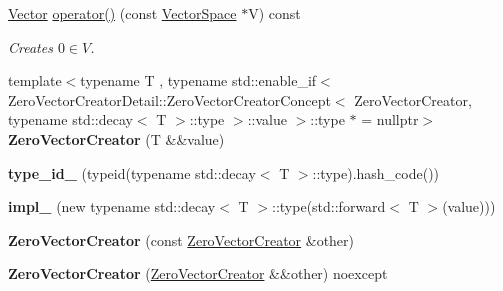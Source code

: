 \begin{DoxyCompactItemize}
\item 
\hypertarget{classSpacy_1_1ZeroVectorCreator_afb20329c56ee527505ef7390eba96870}{\hyperlink{classSpacy_1_1Vector}{\-Vector} \hyperlink{classSpacy_1_1ZeroVectorCreator_afb20329c56ee527505ef7390eba96870}{operator()} (const \hyperlink{classSpacy_1_1VectorSpace}{\-Vector\-Space} $\ast$\-V) const }\label{classSpacy_1_1ZeroVectorCreator_afb20329c56ee527505ef7390eba96870}

\begin{DoxyCompactList}\small\item\em \-Creates $ 0 \in V $. \end{DoxyCompactList}\item 
\hypertarget{classSpacy_1_1ZeroVectorCreator_aa33a8160098d48aa6034497665eaa084}{{\footnotesize template$<$typename T , typename std\-::enable\-\_\-if$<$ Zero\-Vector\-Creator\-Detail\-::\-Zero\-Vector\-Creator\-Concept$<$ Zero\-Vector\-Creator, typename std\-::decay$<$ T $>$\-::type $>$\-::value $>$\-::type $\ast$  = nullptr$>$ }\\{\bfseries \-Zero\-Vector\-Creator} (\-T \&\&value)}\label{classSpacy_1_1ZeroVectorCreator_aa33a8160098d48aa6034497665eaa084}

\item 
\hypertarget{classSpacy_1_1ZeroVectorCreator_a3922905f1512707fefaad55b5181d7ec}{{\bfseries type\-\_\-id\-\_\-} (typeid(typename std\-::decay$<$ \-T $>$\-::type).hash\-\_\-code())}\label{classSpacy_1_1ZeroVectorCreator_a3922905f1512707fefaad55b5181d7ec}

\item 
\hypertarget{classSpacy_1_1ZeroVectorCreator_ab5aa6a250b3c9d5915079a4c3fa36f81}{{\bfseries impl\-\_\-} (new typename std\-::decay$<$ \-T $>$\-::type(std\-::forward$<$ \-T $>$(value)))}\label{classSpacy_1_1ZeroVectorCreator_ab5aa6a250b3c9d5915079a4c3fa36f81}

\item 
\hypertarget{classSpacy_1_1ZeroVectorCreator_a30ae2c5e792fe3f45cbd02aa5068666a}{{\bfseries \-Zero\-Vector\-Creator} (const \hyperlink{classSpacy_1_1ZeroVectorCreator}{\-Zero\-Vector\-Creator} \&other)}\label{classSpacy_1_1ZeroVectorCreator_a30ae2c5e792fe3f45cbd02aa5068666a}

\item 
\hypertarget{classSpacy_1_1ZeroVectorCreator_ad0476e84d16f8eef1e6b55261ef77541}{{\bfseries \-Zero\-Vector\-Creator} (\hyperlink{classSpacy_1_1ZeroVectorCreator}{\-Zero\-Vector\-Creator} \&\&other) noexcept}\label{classSpacy_1_1ZeroVectorCreator_ad0476e84d16f8eef1e6b55261ef77541}


\end{DoxyCompactItemize}
